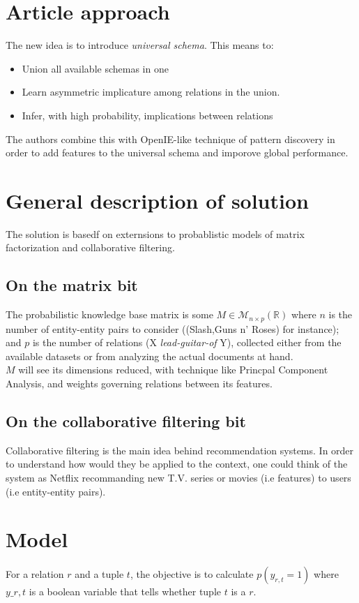 \documentclass[11pt,a4paper]{article}
\begin{document}
\section{Article approach}
The new idea is to introduce \textit{universal schema}. This means to:
\begin{itemize}
\item Union all available schemas in one 
\item Learn asymmetric implicature among relations in the union.
\item Infer, with high probability, implications between relations
\end{itemize} 
The authors combine this with OpenIE-like technique of pattern discovery in order to add features to  the universal schema and imporove global performance.

\section{General description of solution}
The solution is basedf on externsions to probablistic models of matrix factorization and collaborative filtering.
\subsection{On the matrix bit}
The probabilistic knowledge base matrix is some $M \in \mathcal{M}_{n \times p}(\mathbb{R})$ where $n$ is the number of entity-entity pairs to consider ((Slash,Guns n' Roses) for instance); and $p$ is the number of relations (X \textit{lead-guitar-of} Y), collected either from the available datasets or from analyzing the actual documents at hand.\\

$M$ will see its dimensions reduced, with technique like Princpal Component Analysis, and weights governing relations between its features.

\subsection{On the collaborative filtering bit}
Collaborative filtering is the main idea behind recommendation systems. In order to understand how would they be applied to the context, one could think of the system as Netflix recommanding new T.V. series or movies (i.e features) to users (i.e entity-entity pairs).

\section{Model}
For a relation $r$ and a tuple $t$, the objective is to calculate $p(y_{r,t}=1)$ where $y\_{r,t}$ is a boolean variable that tells whether tuple $t$ is a $r$.\\
\end{document}
